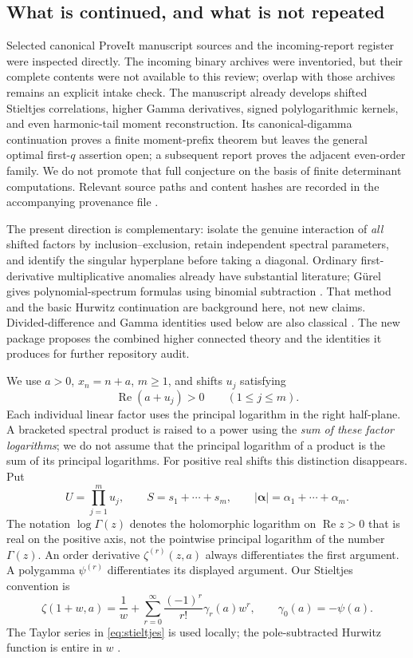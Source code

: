 \documentclass[11pt]{article}
\numberwithin{equation}{section}
\theoremstyle{definition}\newtheorem{definition}[theorem]{Definition}
\theoremstyle{remark}\newtheorem{remark}[theorem]{Remark}
\newcommand{\Rea}{\operatorname{Re}}
\newcommand{\ba}{\boldsymbol{\alpha}}
\begin{document}
\subsection{What is continued, and what is not repeated}
Selected canonical ProveIt manuscript sources and the incoming-report register were inspected directly. The incoming binary archives were inventoried, but their complete contents were not available to this review; overlap with those archives remains an explicit intake check. The manuscript already develops shifted Stieltjes correlations, higher Gamma derivatives, signed polylogarithmic kernels, and even harmonic-tail moment reconstruction. Its canonical-digamma continuation proves a finite moment-prefix theorem but leaves the general optimal first-$q$ assertion open; a subsequent report proves the adjacent even-order family. We do not promote that full conjecture on the basis of finite determinant computations. Relevant source paths and content hashes are recorded in the accompanying provenance file \cite{repo,tailrank,adjacent}.

The present direction is complementary: isolate the genuine interaction of \emph{all} shifted factors by inclusion--exclusion, retain independent spectral parameters, and identify the singular hyperplane before taking a diagonal. Ordinary first-derivative multiplicative anomalies already have substantial literature; G\"urel gives polynomial-spectrum formulas using binomial subtraction \cite{gurel}. That method and the basic Hurwitz continuation are background here, not new claims. Divided-difference and Gamma identities used below are also classical \cite{deboor,dlmfgamma,dlmfzeta}. The new package proposes the combined higher connected theory and the identities it produces for further repository audit.

We use $a>0$, $x_n=n+a$, $m\ge1$, and shifts $u_j$ satisfying
\begin{equation}\label{eq:massdomain}
 \Rea(a+u_j)>0\qquad(1\le j\le m).
\end{equation}
Each individual linear factor uses the principal logarithm in the right half-plane. A bracketed spectral product is raised to a power using the \emph{sum of these factor logarithms}; we do not assume that the principal logarithm of a product is the sum of its principal logarithms. For positive real shifts this distinction disappears. Put
\[
 U=\prod_{j=1}^m u_j,\qquad S=s_1+\cdots+s_m,
 \qquad |\ba|=\alpha_1+\cdots+\alpha_m.
\]
The notation $\log\Gamma(z)$ denotes the holomorphic logarithm on $\operatorname{Re}z>0$ that is real on the positive axis, not the pointwise principal logarithm of the number $\Gamma(z)$. An order derivative $\zeta^{(r)}(z,a)$ always differentiates the first argument. A polygamma $\psi^{(r)}$ differentiates its displayed argument. Our Stieltjes convention is
\begin{equation}\label{eq:stieltjes}
 \zeta(1+w,a)=\frac1w+\sum_{r=0}^{\infty}\frac{(-1)^r}{r!}\gamma_r(a)w^r,
 \qquad \gamma_0(a)=-\psi(a).
\end{equation}
The Taylor series in \eqref{eq:stieltjes} is used locally; the pole-subtracted Hurwitz function is entire in $w$ \cite{dlmfzeta}.
\end{document}
